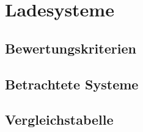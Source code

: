 \chapter{Ladesysteme} %
\section{Bewertungskriterien} %
\section{Betrachtete Systeme} %
\section{Vergleichstabelle}